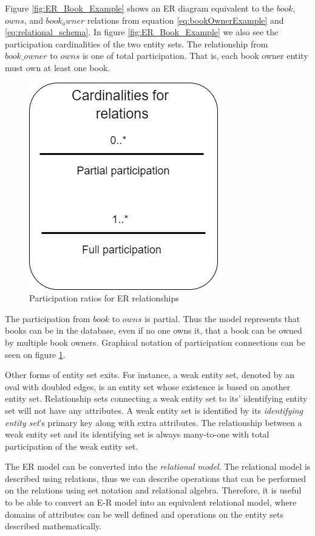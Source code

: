 Figure \ref{fig:ER_Book_Example} shows an ER diagram equivalent to the $book$, $owns$, and $book_owner$ relations from equation \ref{eq:bookOwnerExample} and \ref{eq:relational_schema}.
In figure \ref{fig:ER_Book_Example} we also see the participation cardinalities of the two entity sets. 
The relationship from $book\_owner$ to $owns$ is one of total participation. That is, each book owner entity must own at least one book.
\begin{figure}[h]
    \centering
    \includegraphics[scale=0.5]{Images/cardinalities.png}
    \caption{Participation ratios for ER relationships}
    \label{fig:ERDiagram_Cardinality}
\end{figure}
The participation from $book$ to $owns$ is partial. Thus the model represents that books can be in the database, even if no one owns it, that a book can be owned by multiple book owners.
Graphical notation of participation connections can be seen on figure \ref{fig:ERDiagram_Cardinality}.


Other forms of entity set exits. For instance, a weak entity set, denoted by an oval with doubled edges, is an entity set whose existence is based on another entity set. Relationship sets connecting a weak entity set to its' identifying entity set will not have any attributes\cite{DBSBook}.
A weak entity set is identified by its \textit{identifying entity set}'s primary key along with extra attributes. 
The relationship between a weak entity set and its identifying set is always many-to-one with total participation of the weak entity set.

The ER model can be converted into the \textit{relational model}. The relational model is described using relations, thus we can describe operations that can be performed on the relations using set notation and relational algebra. 
Therefore, it is useful to be able to convert an E-R model into an equivalent relational model, where domains of attributes can be well defined and operations on the entity sets described mathematically.

